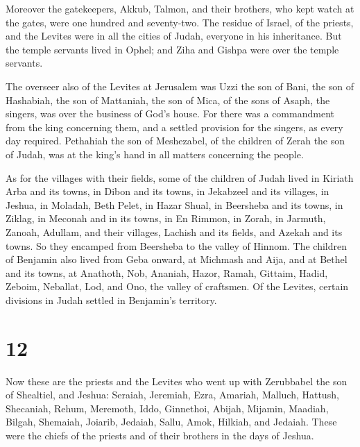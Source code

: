  Moreover the gatekeepers, Akkub, Talmon, and their
brothers, who kept watch at the gates, were one hundred and seventy-two.
 The residue of Israel, of the priests, and the Levites
were in all the cities of Judah, everyone in his inheritance.
 But the temple servants lived in Ophel; and Ziha and
Gishpa were over the temple servants.

 The overseer also of the Levites at Jerusalem was Uzzi the
son of Bani, the son of Hashabiah, the son of Mattaniah, the son of
Mica, of the sons of Asaph, the singers, was over the business of God's
house.  For there was a commandment from the king
concerning them, and a settled provision for the singers, as every day
required.  Pethahiah the son of Meshezabel, of the children
of Zerah the son of Judah, was at the king's hand in all matters
concerning the people.

 As for the villages with their fields, some of the
children of Judah lived in Kiriath Arba and its towns, in Dibon and its
towns, in Jekabzeel and its villages,  in Jeshua, in
Moladah, Beth Pelet,  in Hazar Shual, in Beersheba and its
towns,  in Ziklag, in Meconah and in its towns,
 in En Rimmon, in Zorah, in Jarmuth,  Zanoah,
Adullam, and their villages, Lachish and its fields, and Azekah and its
towns. So they encamped from Beersheba to the valley of Hinnom.
 The children of Benjamin also lived from Geba onward, at
Michmash and Aija, and at Bethel and its towns,  at
Anathoth, Nob, Ananiah,  Hazor, Ramah, Gittaim,
 Hadid, Zeboim, Neballat,  Lod, and Ono, the
valley of craftsmen.  Of the Levites, certain divisions in
Judah settled in Benjamin's territory.

\hypertarget{section-11}{%
\section{12}\label{section-11}}

 Now these are the priests and the Levites who went up with
Zerubbabel the son of Shealtiel, and Jeshua: Seraiah, Jeremiah, Ezra,
 Amariah, Malluch, Hattush,  Shecaniah, Rehum,
Meremoth,  Iddo, Ginnethoi, Abijah,  Mijamin,
Maadiah, Bilgah,  Shemaiah, Joiarib, Jedaiah, 
Sallu, Amok, Hilkiah, and Jedaiah. These were the chiefs of the priests
and of their brothers in the days of Jeshua.

